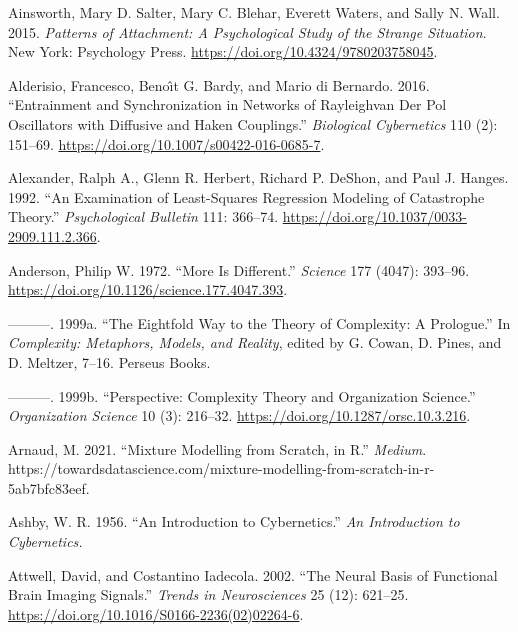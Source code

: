 \documentclass[
  a4paper,
  DIV=11,
  numbers=noendperiod,
  oneside]{scrreprt}
\newlength{\cslhangindent}
\newenvironment{CSLReferences}[2] %
 {\begin{list}{}{%
  \setlength{\itemindent}{0pt}
  \setlength{\leftmargin}{0pt}
  \setlength{\parsep}{0pt}
  \ifodd #1
   \setlength{\leftmargin}{\cslhangindent}
   \setlength{\itemindent}{-1\cslhangindent}
  \fi
  \setlength{\itemsep}{#2\baselineskip}}}
 {\end{list}}
\begin{document}
\begin{CSLReferences}{1}{0}
Ainsworth, Mary D. Salter, Mary C. Blehar, Everett Waters, and Sally N.
Wall. 2015. \emph{Patterns of {Attachment}: {A Psychological Study} of
the {Strange Situation}}. {New York}: {Psychology Press}.
\url{https://doi.org/10.4324/9780203758045}.

Alderisio, Francesco, Benoı̂t G. Bardy, and Mario di Bernardo. 2016.
{``Entrainment and Synchronization in Networks of
{Rayleigh}\textendash van Der {Pol} Oscillators with Diffusive and
{Haken} Couplings.''}
\emph{Biological Cybernetics} 110 (2): 151--69.
\url{https://doi.org/10.1007/s00422-016-0685-7}.

Alexander, Ralph A., Glenn R. Herbert, Richard P. DeShon, and Paul J.
Hanges. 1992. {``An Examination of Least-Squares Regression Modeling of
Catastrophe Theory.''} \emph{Psychological Bulletin} 111: 366--74.
\url{https://doi.org/10.1037/0033-2909.111.2.366}.

Anderson, Philip W. 1972. {``More {Is Different}.''} \emph{Science} 177
(4047): 393--96. \url{https://doi.org/10.1126/science.177.4047.393}.

---------. 1999a. {``The {Eightfold Way} to the {Theory} of
{Complexity}: {A Prologue}.''} In \emph{Complexity: Metaphors, Models,
and Reality}, edited by G. Cowan, D. Pines, and D. Meltzer, 7--16.
{Perseus Books}.

---------. 1999b. {``Perspective: {Complexity Theory} and {Organization
Science}.''} \emph{Organization Science} 10 (3): 216--32.
\url{https://doi.org/10.1287/orsc.10.3.216}.

Arnaud, M. 2021. {``Mixture Modelling from Scratch, in {R}.''}
\emph{Medium}.
https://towardsdatascience.com/mixture-modelling-from-scratch-in-r-5ab7bfc83eef.

Ashby, W. R. 1956. {``An Introduction to Cybernetics.''} \emph{An
Introduction to Cybernetics.}

Attwell, David, and Costantino Iadecola. 2002. {``The Neural Basis of
Functional Brain Imaging Signals.''} \emph{Trends in Neurosciences} 25
(12): 621--25. \url{https://doi.org/10.1016/S0166-2236(02)02264-6}.


\end{CSLReferences}
\end{document}
